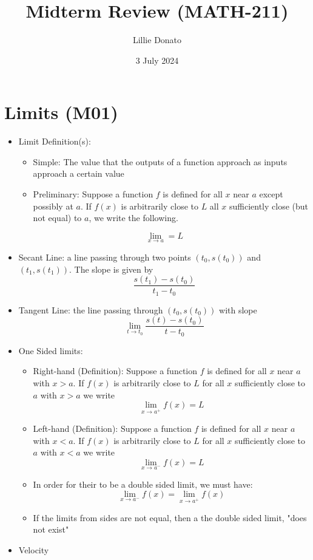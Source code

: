 \documentclass{article}
\title{Midterm Review (MATH-211)}
\author{Lillie Donato}
\date{3 July 2024}
\begin{document}
\maketitle

\section*{Limits (M01)}
\begin{itemize}
    \item Limit Definition(s):
        \begin{itemize}
            \item Simple: The value that the outputs of a function approach as inputs approach a certain value
            \item Preliminary: Suppose a function $f$ is defined for all $x$ near $a$ except possibly at $a$. If $f(x)$ is arbitrarily close to $L$ all $x$ sufficiently close (but not equal) to $a$, we write the following.
        \end{itemize}
        $$\lim_{x \to a}=L$$
    \item Secant Line: a line passing through two points $(t_0, s(t_0))$ and $(t_1, s(t_1))$. The slope is given by
    $$\frac{s(t_1)-s(t_0)}{t_1-t_0}$$
    \item Tangent Line: the line passing through $(t_0, s(t_0))$ with slope $$\lim_{t \to t_0}\frac{s(t)-s(t_0)}{t-t_0}$$
    \item One Sided limits:
        \begin{itemize}
            \item Right-hand (Definition): Suppose a function $f$ is defined for all $x$ near $a$ with $x > a$. If $f(x)$ is arbitrarily close to $L$ for all $x$ sufficiently close to $a$ with $x > a$ we write
            $$\lim_{x \to a^+}{f(x) = L}$$
            \item Left-hand (Definition): Suppose a function $f$ is defined for all $x$ near $a$ with $x < a$. If $f(x)$ is arbitrarily close to $L$ for all $x$ sufficiently close to $a$ with $x < a$ we write
            $$\lim_{x \to a^-}{f(x) = L}$$
            \item In order for their to be a double sided limit, we must have:
            $$\lim_{x \to a^-}{f(x)} = \lim_{x \to a^+}{f(x)}$$
            \item If the limits from sides are not equal, then a the double sided limit, "does not exist"
        \end{itemize}
    \item Velocity

\end{itemize}
\end{document}
